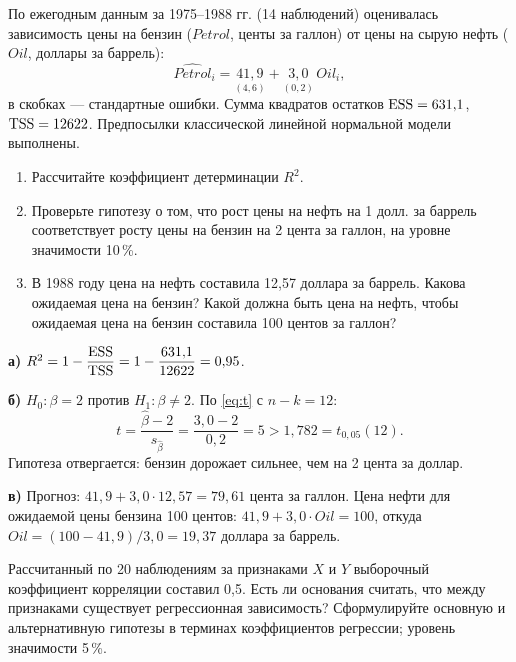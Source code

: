 
По ежегодным данным за 1975--1988 гг. (14 наблюдений) оценивалась
зависимость цены на бензин ($\mathit{Petrol}$, центы за галлон) от цены на
сырую нефть ($\mathit{Oil}$, доллары за баррель):
\[
  \widehat{\mathit{Petrol}}_i = \underset{(4{,}6)}{41{,}9} + \underset{(0{,}2)}{3{,}0}\,\mathit{Oil}_i ,
\]
в скобках — стандартные ошибки. Сумма квадратов остатков $\mathrm{ESS} = 631{,}1$,
$\mathrm{TSS} = 12622$. Предпосылки классической линейной нормальной модели
выполнены.
\begin{enumerate}[label=\asbuk*), leftmargin=2.2em, itemsep=3pt]
  \item Рассчитайте коэффициент детерминации $R^2$.
  \item Проверьте гипотезу о том, что рост цены на нефть на 1 долл. за баррель
        соответствует росту цены на бензин на 2 цента за галлон, на уровне
        значимости 10\,\%.
  \item В 1988 году цена на нефть составила 12,57 доллара за баррель. Какова
        ожидаемая цена на бензин? Какой должна быть цена на нефть, чтобы
        ожидаемая цена на бензин составила 100 центов за галлон?
\end{enumerate}

\begin{solution}
\textbf{а)} $R^2 = 1 - \dfrac{\mathrm{ESS}}{\mathrm{TSS}} = 1 - \dfrac{631{,}1}{12622} = 0{,}95$.

\medskip
\textbf{б)} $H_0\colon \beta = 2$ против $H_1\colon \beta \ne 2$. По
\eqref{eq:t} с $n - k = 12$:
\[
  t = \frac{\widehat{\beta} - 2}{s_{\widehat{\beta}}} = \frac{3{,}0 - 2}{0{,}2} = 5
  > 1{,}782 = t_{0{,}05}(12).
\]
Гипотеза отвергается: бензин дорожает сильнее, чем на 2 цента за доллар.

\medskip
\textbf{в)} Прогноз: $41{,}9 + 3{,}0\cdot 12{,}57 = 79{,}61$ цента за галлон.
Цена нефти для ожидаемой цены бензина 100 центов:
$41{,}9 + 3{,}0\cdot\mathit{Oil} = 100$, откуда
$\mathit{Oil} = (100 - 41{,}9)/3{,}0 = 19{,}37$ доллара за баррель.
\end{solution}


Рассчитанный по 20 наблюдениям за признаками $X$ и $Y$ выборочный
коэффициент корреляции составил 0,5. Есть ли основания считать, что между
признаками существует регрессионная зависимость? Сформулируйте основную и
альтернативную гипотезы в терминах коэффициентов регрессии; уровень
значимости 5\,\%.

